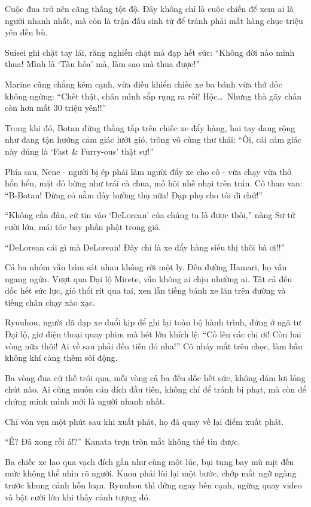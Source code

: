 \documentclass[../main.tex]{subfiles}
\begin{document}
\ct

Cuộc đua trở nên căng thẳng tột độ. Đây không chỉ là cuộc chiến để xem ai là người nhanh nhất, mà còn là trận đấu sinh tử để tránh phải mất hàng chục triệu yên đền bù.

Suisei ghì chặt tay lái, răng nghiến chặt mà đạp hết sức: ``Không đời nào mình thua! Mình là `Tàu hỏa' mà, làm sao mà thua được!''

Marine cũng chẳng kém cạnh, vừa điều khiển chiếc xe ba bánh vừa thở dốc không ngừng: ``Chết thật, chân mình sắp rụng ra rồi! Hộc\dots\ Nhưng thà gãy chân còn hơn mất 30 triệu yên!!''

Trong khi đó, Botan đứng thẳng tắp trên chiếc xe đẩy hàng, hai tay dang rộng như đang tận hưởng cảm giác lướt gió, trông vô cùng thư thái: ``Ôi, cái cảm giác này đúng là `Fast \& Furry-ous' thật sự!''

Phía sau, Nene - người bị ép phải làm người đẩy xe cho cô - vừa chạy vừa thở hổn hển, mặt đỏ bừng như trái cà chua, mồ hôi nhễ nhại trên trán. Cô than van: ``B-Botan! Đừng có nằm đấy hưởng thụ nữa! Đạp phụ cho tôi đi chứ!''

``Không cần đâu, cứ tin vào `DeLorean' của chúng ta là được thôi,'' nàng Sư tử cười lớn, mái tóc bay phần phật trong gió.

``DeLorean cái gì mà DeLorean! Đây chỉ là xe đẩy hàng siêu thị thôi bà ơi!!''

Cả ba nhóm vẫn bám sát nhau không rời một ly. Đến đường Hamari, họ vẫn ngang ngửa. Vượt qua Đại lộ Mirete, vẫn không ai chịu nhường ai. Tất cả đều dốc hết sức lực, gió thổi rít qua tai, xen lẫn tiếng bánh xe lăn trên đường và tiếng chân chạy xào xạc.

Ryuuhou, người đã đạp xe đuổi kịp để ghi lại toàn bộ hành trình, đứng ở ngã tư Đại lộ, giơ điện thoại quay phim mà hét lớn khích lệ: ``Cố lên các chị ơi! Còn hai vòng nữa thôi! Ai về sau phải đền tiền đó nha!'' Cô nháy mắt trêu chọc, làm bầu không khí càng thêm sôi động.

Ba vòng đua cứ thế trôi qua, mỗi vòng cả ba đều dốc hết sức, không dám lơi lỏng chút nào. Ai cũng muốn cán đích đầu tiên, không chỉ để tránh bị phạt, mà còn để chứng minh mình mới là người nhanh nhất.

Chỉ vỏn vẹn một phút sau khi xuất phát, họ đã quay về lại điểm xuất phát.

``Ể? Đã xong rồi á!?'' Kanata trợn tròn mắt không thể tin được.

Ba chiếc xe lao qua vạch đích gần như cùng một lúc, bụi tung bay mù mịt đến mức không thể nhìn rõ người. Kuon phải lùi lại một bước, chớp mắt ngỡ ngàng trước khung cảnh hỗn loạn. Ryuuhou thì đứng ngay bên cạnh, ngừng quay video và bật cười lớn khi thấy cảnh tượng đó.
\end{document}
